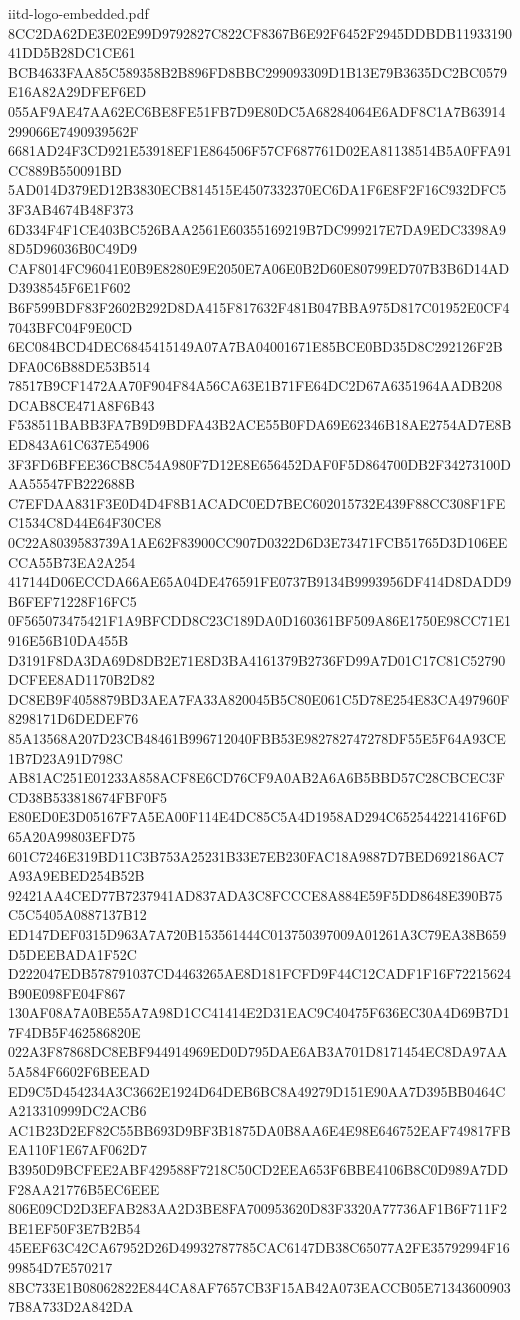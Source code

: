 \begin{filecontents*}[overwrite]{iitd-logo-embedded.pdf}
8CC2DA62DE3E02E99D9792827C822CF8367B6E92F6452F2945DDBDB1193319041DD5B28DC1CE61
BCB4633FAA85C589358B2B896FD8BBC299093309D1B13E79B3635DC2BC0579E16A82A29DFEF6ED
055AF9AE47AA62EC6BE8FE51FB7D9E80DC5A68284064E6ADF8C1A7B63914299066E7490939562F
6681AD24F3CD921E53918EF1E864506F57CF687761D02EA81138514B5A0FFA91CC889B550091BD
5AD014D379ED12B3830ECB814515E4507332370EC6DA1F6E8F2F16C932DFC53F3AB4674B48F373
6D334F4F1CE403BC526BAA2561E60355169219B7DC999217E7DA9EDC3398A98D5D96036B0C49D9
CAF8014FC96041E0B9E8280E9E2050E7A06E0B2D60E80799ED707B3B6D14ADD3938545F6E1F602
B6F599BDF83F2602B292D8DA415F817632F481B047BBA975D817C01952E0CF47043BFC04F9E0CD
6EC084BCD4DEC6845415149A07A7BA04001671E85BCE0BD35D8C292126F2BDFA0C6B88DE53B514
78517B9CF1472AA70F904F84A56CA63E1B71FE64DC2D67A6351964AADB208DCAB8CE471A8F6B43
F538511BABB3FA7B9D9BDFA43B2ACE55B0FDA69E62346B18AE2754AD7E8BED843A61C637E54906
3F3FD6BFEE36CB8C54A980F7D12E8E656452DAF0F5D864700DB2F34273100DAA55547FB222688B
C7EFDAA831F3E0D4D4F8B1ACADC0ED7BEC602015732E439F88CC308F1FEC1534C8D44E64F30CE8
0C22A8039583739A1AE62F83900CC907D0322D6D3E73471FCB51765D3D106EECCA55B73EA2A254
417144D06ECCDA66AE65A04DE476591FE0737B9134B9993956DF414D8DADD9B6FEF71228F16FC5
0F565073475421F1A9BFCDD8C23C189DA0D160361BF509A86E1750E98CC71E1916E56B10DA455B
D3191F8DA3DA69D8DB2E71E8D3BA4161379B2736FD99A7D01C17C81C52790DCFEE8AD1170B2D82
DC8EB9F4058879BD3AEA7FA33A820045B5C80E061C5D78E254E83CA497960F8298171D6DEDEF76
85A13568A207D23CB48461B996712040FBB53E982782747278DF55E5F64A93CE1B7D23A91D798C
AB81AC251E01233A858ACF8E6CD76CF9A0AB2A6A6B5BBD57C28CBCEC3FCD38B533818674FBF0F5
E80ED0E3D05167F7A5EA00F114E4DC85C5A4D1958AD294C652544221416F6D65A20A99803EFD75
601C7246E319BD11C3B753A25231B33E7EB230FAC18A9887D7BED692186AC7A93A9EBED254B52B
92421AA4CED77B7237941AD837ADA3C8FCCCE8A884E59F5DD8648E390B75C5C5405A0887137B12
ED147DEF0315D963A7A720B153561444C013750397009A01261A3C79EA38B659D5DEEBADA1F52C
D222047EDB578791037CD4463265AE8D181FCFD9F44C12CADF1F16F72215624B90E098FE04F867
130AF08A7A0BE55A7A98D1CC41414E2D31EAC9C40475F636EC30A4D69B7D17F4DB5F462586820E
022A3F87868DC8EBF944914969ED0D795DAE6AB3A701D8171454EC8DA97AA5A584F6602F6BEEAD
ED9C5D454234A3C3662E1924D64DEB6BC8A49279D151E90AA7D395BB0464CA213310999DC2ACB6
AC1B23D2EF82C55BB693D9BF3B1875DA0B8AA6E4E98E646752EAF749817FBEA110F1E67AF062D7
B3950D9BCFEE2ABF429588F7218C50CD2EEA653F6BBE4106B8C0D989A7DDF28AA21776B5EC6EEE
806E09CD2D3EFAB283AA2D3BE8FA700953620D83F3320A77736AF1B6F711F2BE1EF50F3E7B2B54
45EEF63C42CA67952D26D49932787785CAC6147DB38C65077A2FE35792994F1699854D7E570217
8BC733E1B08062822E844CA8AF7657CB3F15AB42A073EACCB05E713436009037B8A733D2A842DA

\end{filecontents*}
